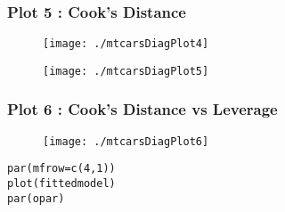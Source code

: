 \documentclass[main.tex]{subfiles}
\begin{document}
\newpage
\subsubsection{Plot 5 :  Cook's Distance}
\begin{figure}[h!]
\centering
\texttt{[image: ./mtcarsDiagPlot4]}

\label{mtcarsDiagPlot4}
\end{figure}


\begin{figure}[h!]
\centering
\texttt{[image: ./mtcarsDiagPlot5]}

\label{mtcarsDiagPlot5}
\end{figure}


\subsubsection{Plot 6 :  Cook's Distance vs Leverage}
\begin{figure}[h!]
\centering
\texttt{[image: ./mtcarsDiagPlot6]}

\label{mtcarsDiagPlot6}
\end{figure}


\begin{framed}
\begin{verbatim}
par(mfrow=c(4,1))
plot(fittedmodel)
par(opar)
\end{verbatim}
\end{framed}

\end{document}
